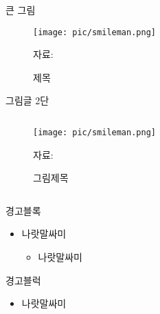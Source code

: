 \documentclass[aspectratio=169,xcolor=dvipsnames,presentation]{beamer}
\begin{document}
\begin{frame}{큰 그림}
\centering
\begin{figure}
    \texttt{[image: pic/smileman.png]}
    \\
    \raggedright %
    \hspace{1em} %
    \tiny{자료: } %
    \caption{제목}
\end{figure}
\end{frame}

\begin{frame}{그림글 2단}
\begin{columns}
    \begin{column}{.5\textwidth}
        \begin{figure}
            \centering
            \texttt{[image: pic/smileman.png]}
            \\
            \raggedright
            \hspace{1em}
            \tiny{자료:}
            \caption{그림제목}
        \end{figure}
    \end{column}

    \begin{column}{.5\textwidth}
    \end{column}
\end{columns}
\end{frame}

\begin{frame}{경고블록}
    \begin{itemize}[<+->]
        \item 나랏말싸미
        \begin{itemize}[<+->]
            \item 나랏말싸미
        \end{itemize}
    \end{itemize}
    \begin{alertblock}{경고블럭}
        \begin{itemize}[<+->]
            \item 나랏말싸미
        \end{itemize}
    \end{alertblock}
\end{frame}
\end{document}
